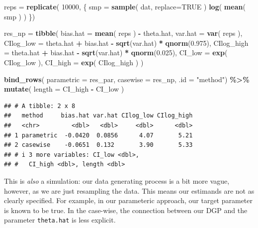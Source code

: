 \documentclass[
]{book}
\newenvironment{Shaded}{\begin{snugshade}}{\end{snugshade}}
\newcommand{\AttributeTok}[1]{\textcolor[rgb]{0.13,0.29,0.53}{#1}}
\newcommand{\ConstantTok}[1]{\textcolor[rgb]{0.56,0.35,0.01}{#1}}
\newcommand{\DecValTok}[1]{\textcolor[rgb]{0.00,0.00,0.81}{#1}}
\newcommand{\FloatTok}[1]{\textcolor[rgb]{0.00,0.00,0.81}{#1}}
\newcommand{\FunctionTok}[1]{\textcolor[rgb]{0.13,0.29,0.53}{\textbf{#1}}}
\newcommand{\NormalTok}[1]{#1}
\newcommand{\OtherTok}[1]{\textcolor[rgb]{0.56,0.35,0.01}{#1}}
\newcommand{\SpecialCharTok}[1]{\textcolor[rgb]{0.81,0.36,0.00}{\textbf{#1}}}
\newcommand{\StringTok}[1]{\textcolor[rgb]{0.31,0.60,0.02}{#1}}
\begin{document}
\begin{Shaded}
\begin{Highlighting}[]
\NormalTok{reps }\OtherTok{=} \FunctionTok{replicate}\NormalTok{( }\DecValTok{10000}\NormalTok{, \{}
\NormalTok{    smp }\OtherTok{=} \FunctionTok{sample}\NormalTok{( dat, }\AttributeTok{replace=}\ConstantTok{TRUE}\NormalTok{ )}
    \FunctionTok{log}\NormalTok{( }\FunctionTok{mean}\NormalTok{( smp ) )}
\NormalTok{\})}

\NormalTok{res\_np }\OtherTok{=} \FunctionTok{tibble}\NormalTok{( }
  \AttributeTok{bias.hat =} \FunctionTok{mean}\NormalTok{( reps ) }\SpecialCharTok{{-}}\NormalTok{ theta.hat,}
  \AttributeTok{var.hat =} \FunctionTok{var}\NormalTok{( reps ),}
  \AttributeTok{CIlog\_low =}\NormalTok{ theta.hat }\SpecialCharTok{+}\NormalTok{ bias.hat }\SpecialCharTok{{-}} \FunctionTok{sqrt}\NormalTok{(var.hat) }\SpecialCharTok{*} \FunctionTok{qnorm}\NormalTok{(}\FloatTok{0.975}\NormalTok{),}
  \AttributeTok{CIlog\_high =}\NormalTok{ theta.hat }\SpecialCharTok{+}\NormalTok{ bias.hat }\SpecialCharTok{{-}} \FunctionTok{sqrt}\NormalTok{(var.hat) }\SpecialCharTok{*} \FunctionTok{qnorm}\NormalTok{(}\FloatTok{0.025}\NormalTok{),}
  \AttributeTok{CI\_low =} \FunctionTok{exp}\NormalTok{( CIlog\_low ),}
  \AttributeTok{CI\_high =} \FunctionTok{exp}\NormalTok{( CIlog\_high ) )}


\FunctionTok{bind\_rows}\NormalTok{( }\AttributeTok{parametric =}\NormalTok{ res\_par, }
           \AttributeTok{casewise =}\NormalTok{ res\_np, }\AttributeTok{.id =} \StringTok{"method"}\NormalTok{) }\SpecialCharTok{\%\textgreater{}\%}
  \FunctionTok{mutate}\NormalTok{( }\AttributeTok{length =}\NormalTok{ CI\_high }\SpecialCharTok{{-}}\NormalTok{ CI\_low )}
\end{Highlighting}
\end{Shaded}

\begin{verbatim}
## # A tibble: 2 x 8
##   method     bias.hat var.hat CIlog_low CIlog_high
##   <chr>         <dbl>   <dbl>     <dbl>      <dbl>
## 1 parametric  -0.0420  0.0856      4.07       5.21
## 2 casewise    -0.0651  0.132       3.90       5.33
## # i 3 more variables: CI_low <dbl>,
## #   CI_high <dbl>, length <dbl>
\end{verbatim}

This is \emph{also} a simulation: our data generating process is a bit more vague, however, as we are just resampling the data.
This means our estimands are not as clearly specified.
For example, in our parameteric approach, our target parameter is known to be true.
In the case-wise, the connection between our DGP and the parameter \texttt{theta.hat} is less explicit.
\end{document}
